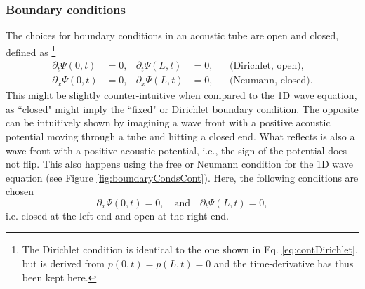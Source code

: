 
\subsubsection{Boundary conditions}
The choices for boundary conditions in an acoustic tube are open and closed, defined as \cite{Bilbao2018}\footnote{The Dirichlet condition is identical to the one shown in Eq. \eqref{eq:contDirichlet}, but is derived from $p(0, t) = p(L, t) = 0$ and the time-derivative has thus been kept here.}
\begin{subequations}\label{eq:contBoundariesBrass}
    \begin{align}
        \partial_t\Psi(0, t) &= 0, & \partial_t\Psi(L, t) &= 0, & &\text{(Dirichlet, open)},\label{eq:contDirichletBrass}\\
        \partial_x\Psi(0, t) &= 0, & \partial_x\Psi(L, t) &= 0, & &\text{(Neumann, closed)}\label{eq:contNeumannBrass}.
    \end{align}
\end{subequations}
This might be slightly counter-intuitive when compared to the 1D wave equation, as ``closed" might imply the ``fixed" or Dirichlet boundary condition. The opposite can be intuitively shown by imagining a wave front with a positive acoustic potential moving through a tube and hitting a closed end. What reflects is also a wave front with a positive acoustic potential, i.e., the sign of the potential does not flip. This also happens using the free or Neumann condition for the 1D wave equation (see Figure \ref{fig:boundaryCondsCont}).
Here, the following conditions are chosen
\begin{equation}\label{eq:openClosed}
    \partial_x\Psi(0, t) = 0, \quad \text{and} \quad \partial_t\Psi(L, t) = 0,
\end{equation}
i.e. closed at the left end and open at the right end.

